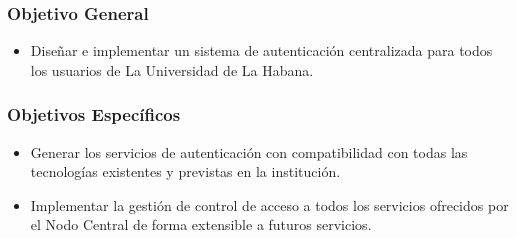 \subsubsection*{Objetivo General}

\begin{itemize}	
	\item Diseñar e implementar un sistema de autenticación centralizada para todos los usuarios de La Universidad de La Habana. 
\end{itemize}

\subsubsection*{Objetivos Específicos}
\begin{itemize}	
	\item Generar los servicios de autenticación con compatibilidad con todas las tecnologías existentes y previstas en la institución.
	\item Implementar la gestión de control de acceso a todos los servicios ofrecidos por el Nodo Central de forma extensible a futuros servicios.
\end{itemize}
